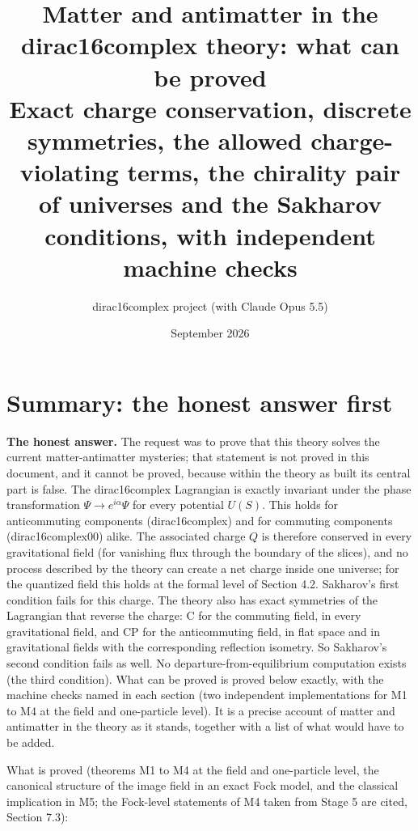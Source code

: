 \documentclass[11pt]{article}
\title{Matter and antimatter in the dirac16complex theory: what can be proved\\[0.5em]\large Exact charge conservation, discrete symmetries, the allowed charge-violating terms, the chirality pair of universes and the Sakharov conditions, with independent machine checks}
\author{dirac16complex project (with Claude Opus 5.5)}
\date{September 2026}
\begin{document}
\maketitle
\tableofcontents
\newpage
\section{Summary: the honest answer first}

\textbf{The honest answer.} The request was to prove that this theory solves the current matter-antimatter mysteries; that statement is not proved in this document, and it cannot be proved, because within the theory as built its central part is false. The dirac16complex Lagrangian is exactly invariant under the phase transformation $\Psi\to e^{i\alpha}\Psi$ for every potential $U(S)$. This holds for anticommuting components (dirac16complex) and for commuting components (dirac16complex00) alike. The associated charge $Q$ is therefore conserved in every gravitational field (for vanishing flux through the boundary of the slices), and no process described by the theory can create a net charge inside one universe; for the quantized field this holds at the formal level of Section 4.2. Sakharov's first condition fails for this charge. The theory also has exact symmetries of the Lagrangian that reverse the charge: C for the commuting field, in every gravitational field, and CP for the anticommuting field, in flat space and in gravitational fields with the corresponding reflection isometry. So Sakharov's second condition fails as well. No departure-from-equilibrium computation exists (the third condition). What can be proved is proved below exactly, with the machine checks named in each section (two independent implementations for M1 to M4 at the field and one-particle level). It is a precise account of matter and antimatter in the theory as it stands, together with a list of what would have to be added.

What is proved (theorems M1 to M4 at the field and one-particle level, the canonical structure of the image field in an exact Fock model, and the classical implication in M5; the Fock-level statements of M4 taken from Stage 5 are cited, Section 7.3):
\end{document}
